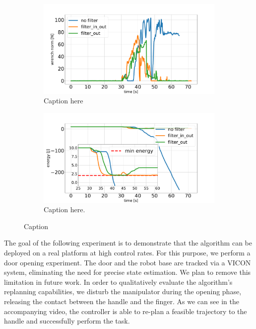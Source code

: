 \begin{figure}[t]
\centering
\hspace*{-0.0cm} 
\begin{subfigure}{\columnwidth}
    \includegraphics[width=\linewidth]{figures/hardware_experiments/wrench_norm.pdf}
    \caption{Caption here}
\end{subfigure}
\hspace*{-0.0cm} 
\begin{subfigure}{\columnwidth}
    \includegraphics[width=\linewidth]{figures/hardware_experiments/tank_energy.pdf}
    \caption{Caption here.}
\end{subfigure}
    \caption{Caption}
    \label{fig:constraint_experiment}
\end{figure}

The goal of the following experiment is to demonstrate that the algorithm can be deployed on a real platform at high control rates. For this purpose, we perform a door opening experiment. The door and the robot base are tracked via a VICON system, eliminating the need for precise state estimation. We plan to remove this limitation in future work. In order to qualitatively evaluate the algorithm's replanning capabilities, we disturb the manipulator during the opening phase, releasing the contact between the handle and the finger. As we can see in the accompanying video, the controller is able to re-plan a feasible trajectory to the handle and successfully perform the task. 

